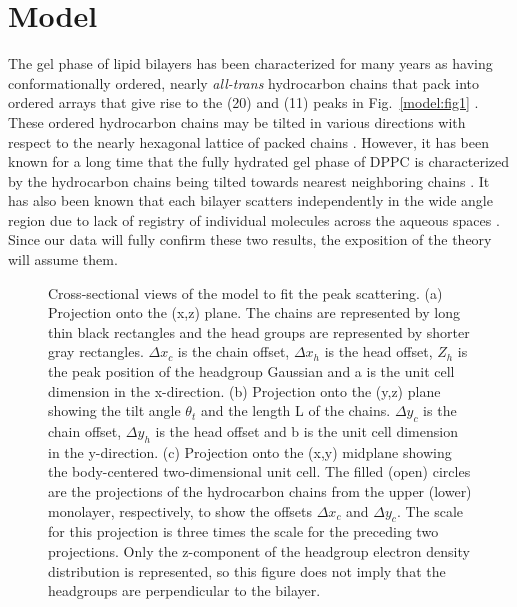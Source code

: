 \section{Model}
\label{gel_model_model}

The gel phase of lipid bilayers has been characterized for many years as
having conformationally ordered, nearly {\em all-trans} hydrocarbon chains
that pack into ordered arrays that give rise to the (20) and (11)
peaks in Fig.\ \ref{model:fig1} \cite{LevTh,Tar73}.
These ordered hydrocarbon chains may be tilted in various directions with respect 
to the nearly hexagonal lattice of packed chains \cite{Smi88}.  However, it 
has been known for a long time that the fully hydrated gel phase of DPPC is 
characterized by the hydrocarbon chains being tilted towards nearest neighboring 
chains \cite{LevTh}.  It has also been known that each bilayer scatters 
independently in the wide angle region due to lack of registry of individual 
molecules across the aqueous spaces \cite{LevTh,Tar73}.  Since our data will 
fully confirm these two results, the exposition of the theory will assume them.

\begin{figure}
\begin{center}
\raggedleft
\hspace{0.5in}
\raggedright
\hspace{1.2in}
\end{center}
\begin{center}
\leavevmode
{}
\end{center}
\caption{Cross-sectional views of the model to fit the peak scattering.
(a) Projection onto the (x,z) plane.  The chains are represented
by long thin black rectangles and the head groups are represented by shorter
gray rectangles.  ${\Delta x}_{c}$ is the chain offset, ${\Delta x}_{h}$ is the
head offset, $Z_{h}$ is the peak position of the headgroup Gaussian and a is the
unit cell dimension in the x-direction.
(b) Projection onto the (y,z) plane showing the tilt angle ${\theta}_{t}$
and the length L of the chains.  ${\Delta y}_{c}$ is the chain offset,
${\Delta y}_{h}$ is the head offset and b is the unit cell
dimension in the y-direction.
(c) Projection onto the (x,y) midplane showing the body-centered
two-dimensional unit cell.  The filled (open) circles are the projections of
the hydrocarbon chains from the upper (lower) monolayer, respectively, to show
the offsets ${\Delta x}_{c}$ and ${\Delta y}_{c}$.  The scale for
this projection is
three times the scale for the preceding two projections.
Only the z-component of the headgroup electron density distribution is
represented, so this figure does not imply that the headgroups are
perpendicular to the bilayer.
\label{model:fig2}}
\end{figure}

